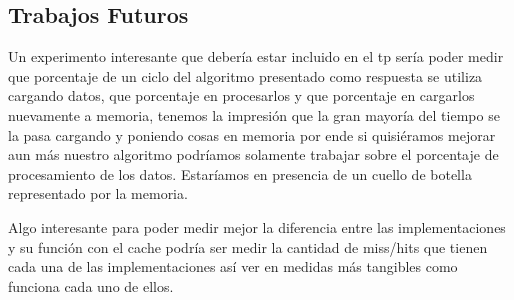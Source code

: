 \subsection{Trabajos Futuros}
Un experimento interesante que debería estar incluido en el tp sería poder medir que porcentaje de un ciclo del algoritmo presentado como respuesta se utiliza cargando datos, que porcentaje en procesarlos y que porcentaje en cargarlos nuevamente a memoria, tenemos la impresión que la gran mayoría del tiempo se la pasa cargando y poniendo cosas en memoria por ende si quisiéramos mejorar aun más nuestro algoritmo podríamos solamente trabajar sobre el porcentaje de procesamiento de los datos. Estaríamos en presencia de un cuello de botella representado por la memoria.

Algo interesante para poder medir mejor la diferencia entre las implementaciones y su función con el cache podría ser medir la cantidad de miss/hits que tienen cada una de las implementaciones así ver en medidas más tangibles como funciona cada uno de ellos.

